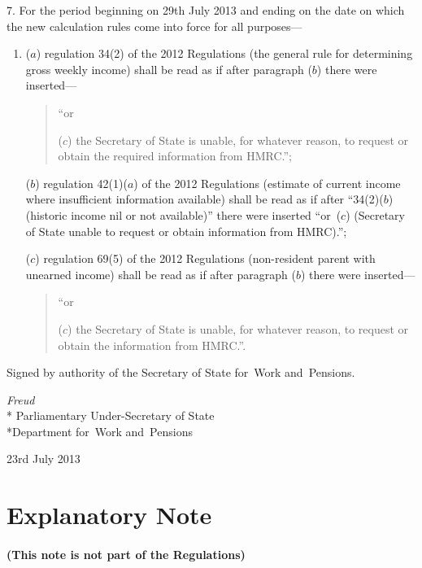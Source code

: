 \documentclass[12pt,a4paper]{article}
\begin{document}
7.  For the period beginning on 29th July 2013 and ending on the date on which the new calculation rules come into force for all purposes—
\begin{enumerate}\item[]
($a$) regulation 34(2) of the 2012 Regulations (the general rule for determining gross weekly income) shall be read as if after paragraph ($b$)  there were inserted—
\begin{quotation}
“or

($c$) the Secretary of State is unable, for whatever reason, to request or obtain the required information from HMRC.”;
\end{quotation}

($b$) regulation 42(1)($a$)  of the 2012 Regulations (estimate of current income where insufficient information available) shall be read as if after “34(2)($b$)  (historic income nil or not available)” there were inserted “or~($c$)  (Secretary of State unable to request or obtain information from HMRC).”;

($c$) regulation 69(5) of the 2012 Regulations (non-resident parent with unearned income) shall be read as if after paragraph ($b$)  there were inserted—
\begin{quotation}
“or

($c$) the Secretary of State is unable, for whatever reason, to request or obtain the information from HMRC.”.
\end{quotation}
\end{enumerate}

\bigskip

\pagebreak[3]

Signed 
by authority of the 
Secretary of State for~Work and~Pensions.

{\raggedleft
\emph{Freud}\\*
Parliamentary Under-Secretary 
of State\\*Department 
for~Work and~Pensions

}

23rd July 2013

\small

\part{Explanatory Note}

\renewcommand\parthead{— Explanatory Note}

\subsection*{(This note is not part of the Regulations)}
\end{document}
